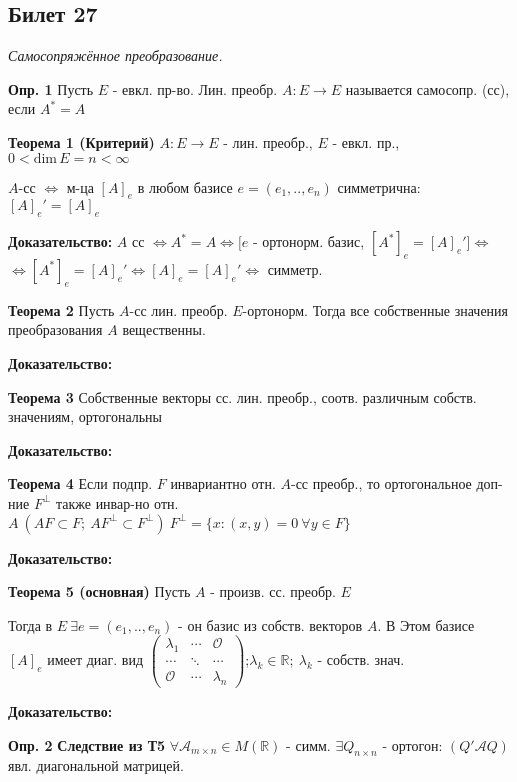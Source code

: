 \subsection{Билет 27}

\textit{Самосопряжённое преобразование.}

\textbf{Опр. 1} Пусть $E $ - евкл. пр-во. Лин. преобр. $A : E \to E$ называется самосопр. (сс), если $A^* = A$

\textbf{Теорема 1 (Критерий)} $A : E \to E$ - лин. преобр., $E$ - евкл. пр., $0 < \mathrm{dim}\,E = n < \infty$

$A$-сс $\Leftrightarrow$ м-ца $[A]_e$ в любом базисе $e=(e_1,..,e_n)$ симметрична: $[A]_e' = [A]_e$

\textbf{Доказательство:} $A$ сс $\Leftrightarrow A^* = A \Leftrightarrow [ e$ - ортонорм. базис, $[A^*]_e = [A]_e' ] \Leftrightarrow$\\$ \Leftrightarrow [A^*]_e = [A]_e' \Leftrightarrow [A]_e = [A]_e' \Leftrightarrow $ симметр.

\textbf{Теорема 2} Пусть $A$-сс лин. преобр. $E$-ортонорм. Тогда все собственные значения преобразования $A$ вещественны.

\textbf{Доказательство:}


\textbf{Теорема 3} Собственные векторы сс. лин. преобр., соотв. различным собств. значениям, ортогональны

\textbf{Доказательство:}


\textbf{Теорема 4} Если подпр. $F$ инвариантно отн. $A$-сс преобр., то ортогональное доп-ние $F^\perp$ также инвар-но отн. $A\ (AF\subset F;\ AF^\perp \subset F^\perp)\ F^\perp = \{ x : (x,y)=0\ \forall y \in F \}$

\textbf{Доказательство:}


\textbf{Теорема 5 (основная)} Пусть $A$ - произв. сс. преобр. $E$

Тогда в $E\ \exists e=(e_1,..,e_n)$ - он базис из собств. векторов $A$. В Этом базисе $[A]_e$ имеет диаг. вид 
$\begin{pmatrix}
  \lambda_1 & \cdots & \mathcal{O} \\
  \cdots & \ddots & \cdots \\
  \mathcal{O} & \cdots & \lambda_n
 \end{pmatrix}
$;\quad $\lambda_k \in \mathbb{R};\ \lambda_k$ - собств. знач.

\textbf{Доказательство: }

\textbf{Опр. 2}
\textbf{Следствие из Т5} $\forall \mathcal{A}_{m\times n} \in M(\mathbb{R})$ - симм. $\exists Q_{n\times n}$ - ортогон: $(Q'\mathcal{A}Q)$ явл. диагональной матрицей.